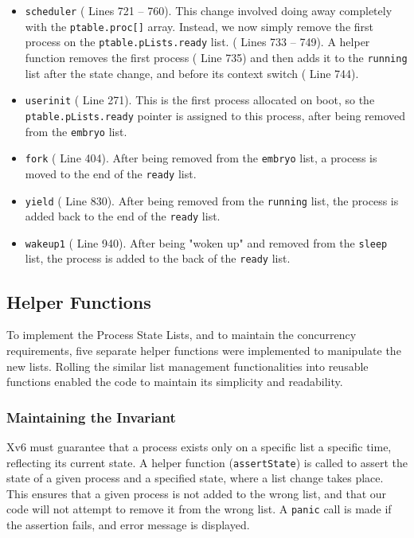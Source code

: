 \documentclass[11pt,letterpaper]{report}
\begin{document}
 	\begin{itemize}
 		\item {\tt scheduler} ({\color{red} Lines 721 -- 760}). This change involved doing away completely with the {\tt ptable.proc[]} array. Instead, we now simply remove the first process on the {\tt ptable.pLists.ready} list. ({\color{red} Lines 733 -- 749}). A helper function removes the first process ({\color{red} Line 735}) and then adds it to the {\tt running} list after the state change, and before its context switch ({\color{red} Line 744}).
 		\item {\tt userinit} ({\color{red} Line 271}). This is the first process allocated on boot, so the {\tt ptable.pLists.ready} pointer is assigned to this process, after being removed from the {\tt embryo} list.
 		\item {\tt fork} ({\color{red} Line 404}). After being removed from the {\tt embryo} list, a process is moved to the end of the {\tt ready} list.
 		\item {\tt yield} ({\color{red} Line 830}). After being removed from the {\tt running} list, the process is added back to the end of the {\tt ready} list.
 		\item {\tt wakeup1} ({\color{red} Line 940}). After being "woken up" and removed from the {\tt sleep} list, the process is added to the back of the {\tt ready} list.
 	\end{itemize}
 	
 	\subsection{Helper Functions}
 	
 	To implement the Process State Lists, and to maintain the concurrency requirements, five separate helper functions were implemented to manipulate the new lists. Rolling the similar list management functionalities into reusable functions enabled the code to maintain its simplicity and readability.
 	
 	\subsubsection{Maintaining the Invariant} Xv6 must guarantee that a process exists only on a specific list a specific time, reflecting its current state. A helper function ({\tt assertState}) is called to assert the state of a given process and a specified state, where a list change takes place. This ensures that a given process is not added to the wrong list, and that our code will not attempt to remove it from the wrong list. A {\tt panic} call is made if the assertion fails, and error message is displayed.
 	
\end{document}
